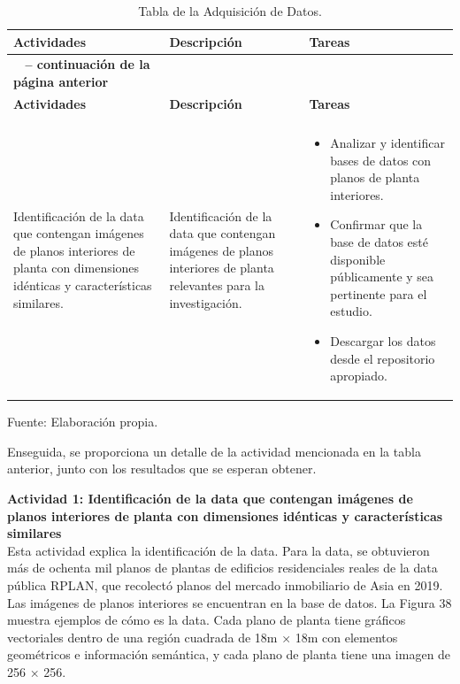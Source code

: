 \begin{longtable}{>{\raggedright\arraybackslash}p{4cm} >{\raggedright\arraybackslash}p{4cm} >{\raggedright\arraybackslash}p{5cm}}
    \caption{Tabla de la Adquisición de Datos.}
    \label{tabla:actividades}\\
    \hline
    \textbf{Actividades} & \textbf{Descripción} & \textbf{Tareas}\\
    \hline
    \endfirsthead

    \multicolumn{3}{c}%
    {{\bfseries \tablename\ \thetable{} -- continuación de la página anterior}} \\
    \hline
    \textbf{Actividades} & \textbf{Descripción} & \textbf{Tareas}\\
    \hline
    \endhead

    \hline
    \multicolumn{3}{r}{{Continúa en la siguiente página}} \\
    \endfoot

    \hline
    \endlastfoot

    Identificación de la data que contengan imágenes de planos interiores de planta con dimensiones idénticas y características similares. & Identificación de la data que contengan imágenes de planos interiores de planta relevantes para la investigación. & 
    \begin{itemize}
        \item Analizar y identificar bases de datos con planos de planta interiores.
        \item Confirmar que la base de datos esté disponible públicamente y sea pertinente para el estudio.
        \item Descargar los datos desde el repositorio apropiado.
    \end{itemize} \\
\end{longtable}


\begin{flushleft}
    \small Fuente: Elaboración propia.
\end{flushleft}

Enseguida, se proporciona un detalle de la actividad mencionada en la tabla anterior, junto con los resultados que se esperan obtener.

\textbf{Actividad 1: Identificación de la data que contengan imágenes de planos interiores de planta con dimensiones idénticas y características similares}
\\
Esta actividad explica la identificación de la data. Para la data, se obtuvieron más de ochenta mil planos de plantas de edificios residenciales reales de la data pública RPLAN, que recolectó planos del mercado inmobiliario de Asia en 2019. Las imágenes de planos interiores se encuentran en la base de datos. La Figura 38 muestra ejemplos de cómo es la data. Cada plano de planta tiene gráficos vectoriales dentro de una región cuadrada de 18m × 18m con elementos geométricos e información semántica, y cada plano de planta tiene una imagen de 256 × 256.


